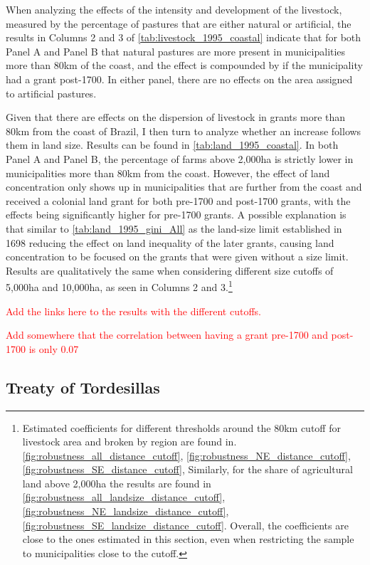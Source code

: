 \documentclass[11pt]{article}
\newcommand{\red}[1]{\textcolor{red}{#1}}
\begin{document}
When analyzing the effects of the intensity and development of the livestock, measured by the percentage of pastures that are either natural or artificial, the results in Columns 2 and 3 of \autoref{tab:livestock_1995_coastal} indicate that for both Panel A and Panel B that natural pastures are more present in municipalities more than 80km of the coast, and the effect is compounded by if the municipality had a grant post-1700.
In either panel, there are no effects on the area assigned to artificial pastures.

Given that there are effects on the dispersion of livestock in grants more than 80km from the coast of Brazil, I then turn to analyze whether an increase follows them in land size.
Results can be found in \autoref{tab:land_1995_coastal}.
In both Panel A and Panel B, the percentage of farms above 2,000ha is strictly lower in municipalities more than 80km from the coast. 
However, the effect of land concentration only shows up in municipalities that are further from the coast and received a colonial land grant for both pre-1700 and post-1700 grants, with the effects being significantly higher for pre-1700 grants.
A possible explanation is that similar to \autoref{tab:land_1995_gini_All} as the land-size limit established in 1698 reducing the effect on land inequality of the later grants, causing land concentration to be focused on the grants that were given without a size limit.
Results are qualitatively the same when considering different size cutoffs of 5,000ha and 10,000ha, as seen in Columns 2 and 3.\footnote{Estimated coefficients for different thresholds around the 80km cutoff for livestock area and broken by region are found in. 
\autoref{fig:robustness_all_distance_cutoff},
\autoref{fig:robustness_NE_distance_cutoff},
\autoref{fig:robustness_SE_distance_cutoff},
Similarly, for the share of agricultural land above 2,000ha the results are found in
\autoref{fig:robustness_all_landsize_distance_cutoff},
\autoref{fig:robustness_NE_landsize_distance_cutoff}, 
\autoref{fig:robustness_SE_landsize_distance_cutoff}. 
Overall, the coefficients are close to the ones estimated in this section, even when restricting the sample to municipalities close to the cutoff.}

\red{Add the links here to the results with the different cutoffs.}

\red{Add somewhere that the correlation between having a grant pre-1700 and post-1700 is only 0.07}

\subsection{Treaty of Tordesillas}
\end{document}
